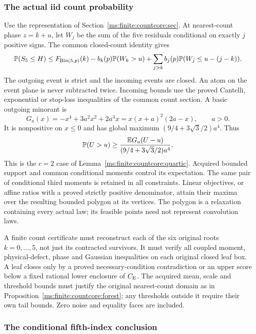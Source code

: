 \subsubsection{The actual iid count probability}

Use the representation of Section~\ref{ms:finite:countcore:sec}. At nearest-count
phase $z=k+u$, let $W_j$ be the sum of the five residuals conditional on
exactly $j$ positive signs. The common closed-count identity gives
\begin{equation}\label{ms:finite:five:eq:outgoing}
 \mathbb P(S_5\le H)\le F_{\mathrm{Bin}(5,p)}(k)
 -b_k(p)\mathbb P(W_k>u)
 +\sum_{j>k}b_j(p)\mathbb P(W_j\le u-(j-k)).
\end{equation}
The outgoing event is strict and the incoming events are closed.
An atom on the event plane is never subtracted twice.
Incoming bounds use the proved Cantelli, exponential or stop-loss
inequalities of the common count section. A basic outgoing minorant is
\[
 G_a(x)=-x^4+3a^2x^2+2a^3x=x(x+a)^2(2a-x),\qquad a>0.
\]
It is nonpositive on $x\le0$ and has global maximum
$(9/4+3\sqrt3/2)a^4$. Thus
\[
 \mathbb P(U>u)\ge\frac{\mathbb E G_a(U-u)}{(9/4+3\sqrt3/2)a^4}.
\]
This is the $c=2$ case of Lemma~\ref{ms:finite:countcore:quartic}.
Acquired bounded support and common conditional moments control its
expectation. The same pair of conditional third moments is retained in
all constraints. Linear objectives, or affine ratios with a proved
strictly positive denominator, attain their maxima over the resulting
bounded polygon at its vertices. The polygon is a relaxation containing
every actual law; its feasible points need not represent convolution laws.

A finite count certificate must reconstruct each of the six original
roots $k=0,\ldots,5$, not just its contracted survivors. It must verify
all coupled moment, physical-defect, phase and Gaussian inequalities on
each original closed leaf box. A leaf closes only by a proved
necessary-condition contradiction or an upper score below a fixed
rational lower enclosure of $C_{\mathrm E}$. The acquired mean, scale and
threshold bounds must justify the original nearest-count domain as in
Proposition~\ref{ms:finite:countcore:forest}; any thresholds outside it require
their own tail bounds. Zero noise and equality faces are included.

\subsubsection{The conditional fifth-index conclusion}

